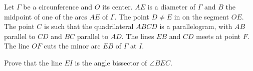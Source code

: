Let $\Gamma$ be a circunference and $O$ its center. $AE$ is a diameter of $\Gamma$ and $B$ the midpoint of one of the arcs $AE$ of $\Gamma$. The point $D \ne E$ in on the segment $OE$. The point $C$ is such that the quadrilateral $ABCD$ is a parallelogram, with $AB$ parallel to $CD$ and $BC$ parallel to $AD$. The lines $EB$ and $CD$ meets at point $F$. The line $OF$ cuts the minor arc $EB$ of $\Gamma$ at $I$.

Prove that the line $EI$ is the angle bissector of $\angle BEC$.